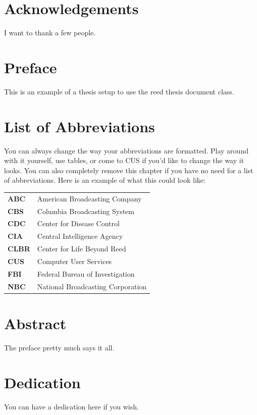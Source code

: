     \chapter*{Acknowledgements}
	I want to thank a few people.

    \chapter*{Preface}
	This is an example of a thesis setup to use the reed thesis document class.
	
	    \chapter*{List of Abbreviations}
		You can always change the way your abbreviations are formatted. Play around with it yourself, use tables, or come to CUS if you'd like to change the way it looks. You can also completely remove this chapter if you have no need for a list of abbreviations. Here is an example of what this could look like:

	\begin{table}[h]
	\centering %
	\begin{tabular}{ll}
		\textbf{ABC}  	&  American Broadcasting Company \\
		\textbf{CBS}  	&  Columbia Broadcasting System\\
		\textbf{CDC}  	&  Center for Disease Control \\
		\textbf{CIA}  	&  Central Intelligence Agency\\
		\textbf{CLBR} 	&  Center for Life Beyond Reed\\
		\textbf{CUS}  	&  Computer User Services\\
		\textbf{FBI}  	&  Federal Bureau of Investigation\\
		\textbf{NBC}  	&  National Broadcasting Corporation\\
	\end{tabular}
	\end{table}
	

    \tableofcontents

    \chapter*{Abstract}
	The preface pretty much says it all.
	
    \chapter*{Dedication}
	You can have a dedication here if you wish.
	
	
	
	\mainmatter %
  \pagestyle{fancyplain} %
	
	